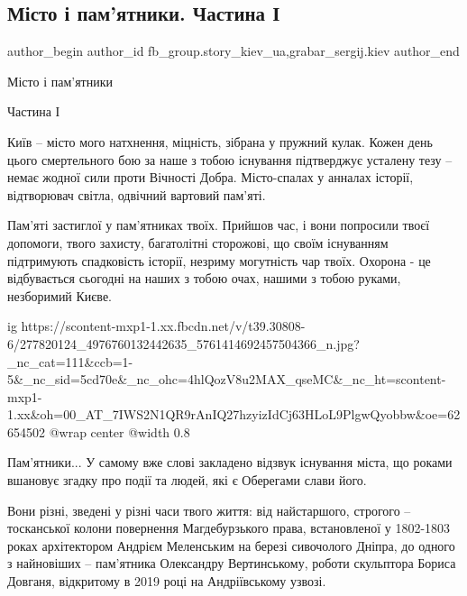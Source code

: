  
 
 
 
 
 
\subsection{Місто і пам'ятники. Частина І}
\label{sec:07_04_2022.fb.fb_group.story_kiev_ua.1.misto_i_pamjatnyky_chastyna_1}
 
\ifcmt
 author_begin
   author_id fb_group.story_kiev_ua,grabar_sergij.kiev
 author_end
\fi

Місто і пам'ятники

Частина І

Київ – місто мого натхнення, міцність, зібрана у пружний кулак. Кожен день
цього смертельного бою за наше з тобою існування підтверджує усталену тезу –
немає жодної сили проти Вічності Добра. Місто-спалах у анналах історії,
відтворювач світла, одвічний вартовий пам'яті.

Пам'яті застиглої у пам'ятниках твоїх. Прийшов час, і вони попросили твоєї
допомоги, твого захисту, багатолітні сторожові, що своїм існуванням підтримують
спадковість історії, незриму могутність чар твоїх. Охорона - це відбувається
сьогодні на наших з тобою очах, нашими з тобою руками, незборимий Києве.

\ifcmt
  ig https://scontent-mxp1-1.xx.fbcdn.net/v/t39.30808-6/277820124_4976760132442635_5761414692457504366_n.jpg?_nc_cat=111&ccb=1-5&_nc_sid=5cd70e&_nc_ohc=4hlQozV8u2MAX_qseMC&_nc_ht=scontent-mxp1-1.xx&oh=00_AT_7IWS2N1QR9rAnIQ27hzyizIdCj63HLoL9PlgwQyobbw&oe=62654502
  @wrap center
  @width 0.8
\fi

Пам'ятники... У самому вже слові закладено відзвук існування міста, що роками
вшановує згадку про події та людей, які є Оберегами слави його.

Вони різні, зведені у різні часи твого життя: від найстаршого, строгого --
тосканської колони повернення Магдебурзького права, встановленої у 1802-1803
роках архітектором Андрієм Меленським на березі сивочолого Дніпра, до одного з
найновіших – пам'ятника Олександру Вертинському, роботи скульптора Бориса
Довганя, відкритому в 2019 році на Андріївському узвозі.

